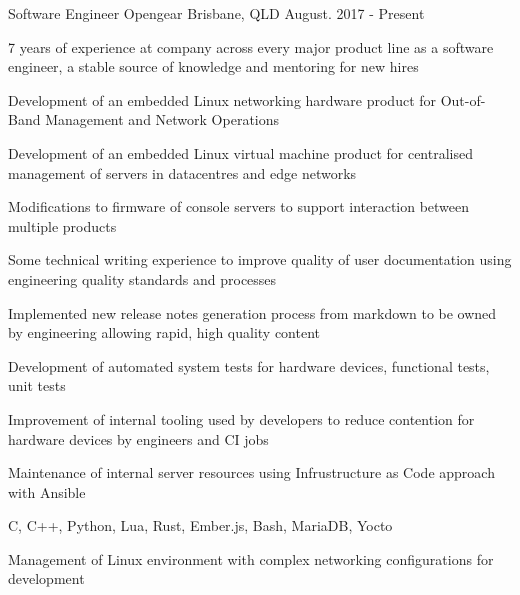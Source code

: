 

\begin{cventries}

  \cventry
    {Software Engineer} %
    {Opengear} %
    {Brisbane, QLD} %
    {August. 2017 - Present} %
    {
      \begin{cvitems} %
        \item {7 years of experience at company across every major product line as a software engineer, a stable source of knowledge and mentoring for new hires}
        \item {Development of an embedded Linux networking hardware product for Out-of-Band Management and Network Operations}
        \item {Development of an embedded Linux virtual machine product for centralised management of servers in datacentres and edge networks}
        \item {Modifications to firmware of console servers to support interaction between multiple products}
        \item {Some technical writing experience to improve quality of user documentation using engineering quality standards and processes}
        \item {Implemented new release notes generation process from markdown to be owned by engineering allowing rapid, high quality content}
        \item {Development of automated system tests for hardware devices, functional tests, unit tests}
        \item {Improvement of internal tooling used by developers to reduce contention for hardware devices by engineers and CI jobs}
        \item {Maintenance of internal server resources using Infrustructure as Code approach with Ansible}
        \item {C, C++, Python, Lua, Rust, Ember.js, Bash, MariaDB, Yocto}
        \item {Management of Linux environment with complex networking configurations for development}

\end{cvitems}}
\end{cventries}
